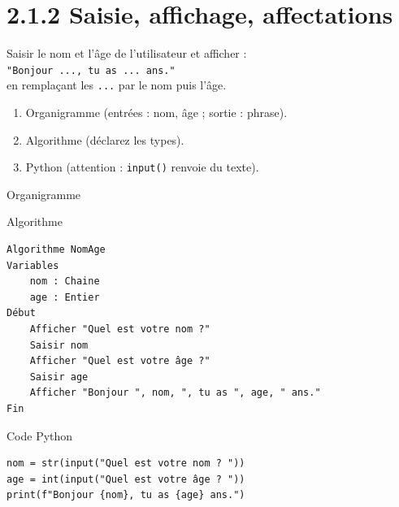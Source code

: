 \documentclass[12pt,a4paper]{article}
\begin{document}
\section*{2.1.2 Saisie, affichage, affectations}

\begin{exobox}[title=\textbf{Exercice 3 — Nom et âge}]
Saisir le nom et l’âge de l’utilisateur et afficher :\\
\texttt{"Bonjour ..., tu as ... ans."}\\
en remplaçant les \texttt{...} par le nom puis l’âge.
\end{exobox}

\begin{taskbox}
\begin{enumerate}
  \item Organigramme (entrées : nom, âge ; sortie : phrase).
  \item Algorithme (déclarez les types).
  \item Python (attention : \texttt{input()} renvoie du texte).
\end{enumerate}
\end{taskbox}

\begin{ansbox}{Organigramme}
\end{ansbox}

\begin{ansbox}{Algorithme}
\begin{verbatim}
Algorithme NomAge
Variables
    nom : Chaine
    age : Entier
Début
    Afficher "Quel est votre nom ?"
    Saisir nom
    Afficher "Quel est votre âge ?"
    Saisir age
    Afficher "Bonjour ", nom, ", tu as ", age, " ans."
Fin
\end{verbatim}
\end{ansbox}

\begin{ansbox}{Code Python}
\begin{verbatim}
nom = str(input("Quel est votre nom ? "))
age = int(input("Quel est votre âge ? "))
print(f"Bonjour {nom}, tu as {age} ans.")
\end{verbatim}
\end{ansbox}
\end{document}
